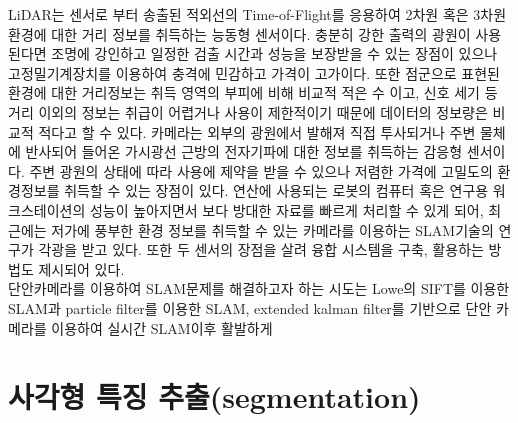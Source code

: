 \documentclass[master,korean,final]{cbnu-ecs}
\begin{document}
LiDAR는 센서로 부터 송출된 적외선의 Time-of-Flight를 응용하여 2차원 혹은 3차원 환경에 대한 거리 정보를 취득하는 능동형 센서이다. 충분히 강한 출력의 광원이 사용된다면 조명에 강인하고 일정한 검출 시간과 성능을 보장받을 수 있는 장점이 있으나 고정밀기계장치를 이용하여 충격에 민감하고 가격이 고가이다. 또한 점군으로 표현된 환경에 대한 거리정보는 취득 영역의 부피에 비해 비교적 적은 수 이고, 신호 세기 등 거리 이외의 정보는 취급이 어렵거나 사용이 제한적이기 때문에 데이터의 정보량은 비교적 적다고 할 수 있다. 카메라는 외부의 광원에서 발해져 직접 투사되거나 주변 물체에 반사되어 들어온 가시광선 근방의 전자기파에 대한 정보를 취득하는 감응형 센서이다. 주변 광원의 상태에 따라 사용에 제약을 받을 수 있으나 저렴한 가격에 고밀도의 환경정보를 취득할 수 있는 장점이 있다. 연산에 사용되는 로봇의 컴퓨터 혹은 연구용 워크스테이션의 성능이 높아지면서 보다 방대한 자료를 빠르게 처리할 수 있게 되어, 최근에는 저가에 풍부한 환경 정보를 취득할 수 있는 카메라를 이용하는 SLAM기술의 연구가 각광을 받고 있다. 또한 두 센서의 장점을 살려 융합 시스템을 구축, 활용하는 방법도 제시되어 있다\cite{Newman2006}.\\

단안카메라를 이용하여 SLAM문제를 해결하고자 하는 시도는 Lowe의 SIFT를 이용한 SLAM\cite{Se2005}과 particle filter를 이용한 SLAM\cite{Eade2006}, extended kalman filter를 기반으로 단안 카메라를 이용하여 실시간 SLAM\cite{Davison2007}이후 활발하게  

\cite{Klein2007}%
\cite{Milford2008}%
\cite{Cummins2011}%
\cite{Milford2012}%
\cite{Forster2014b}%
\cite{Engel2014}%

\cite{Zhang2015}%
\cite{Moreno2013}%
\cite{Lu2014c}%
\cite{Li2014}%



\chapter{사각형 특징 추출(segmentation)}
\end{document}
